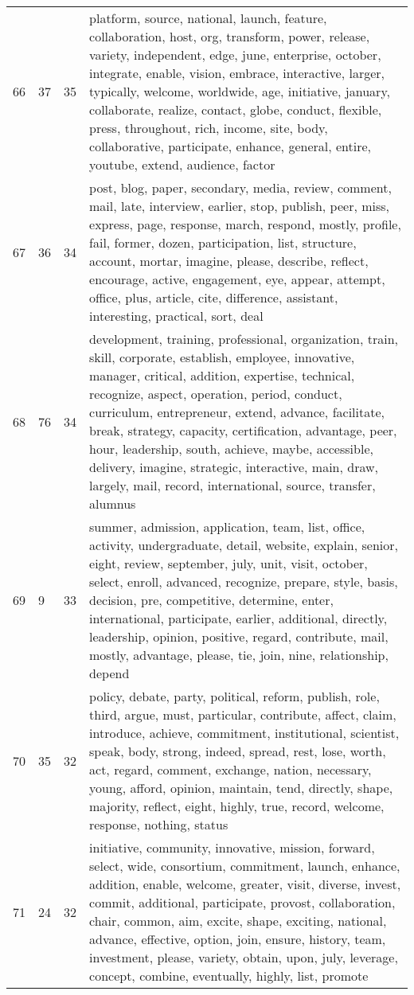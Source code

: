 \begin{table}[ht]
{\begin{tabularx}{\textwidth}{llrX}
   66 & 37 & 35 & platform, source, national, launch, feature, collaboration, host, org, transform, power, release, variety, independent, edge, june, enterprise, october, integrate, enable, vision, embrace, interactive, larger, typically, welcome, worldwide, age, initiative, january, collaborate, realize, contact, globe, conduct, flexible, press, throughout, rich, income, site, body, collaborative, participate, enhance, general, entire, youtube, extend, audience, factor \\ 
   67 & 36 & 34 & post, blog, paper, secondary, media, review, comment, mail, late, interview, earlier, stop, publish, peer, miss, express, page, response, march, respond, mostly, profile, fail, former, dozen, participation, list, structure, account, mortar, imagine, please, describe, reflect, encourage, active, engagement, eye, appear, attempt, office, plus, article, cite, difference, assistant, interesting, practical, sort, deal \\ 
   68 & 76 & 34 & development, training, professional, organization, train, skill, corporate, establish, employee, innovative, manager, critical, addition, expertise, technical, recognize, aspect, operation, period, conduct, curriculum, entrepreneur, extend, advance, facilitate, break, strategy, capacity, certification, advantage, peer, hour, leadership, south, achieve, maybe, accessible, delivery, imagine, strategic, interactive, main, draw, largely, mail, record, international, source, transfer, alumnus \\ 
   69 & 9 & 33 & summer, admission, application, team, list, office, activity, undergraduate, detail, website, explain, senior, eight, review, september, july, unit, visit, october, select, enroll, advanced, recognize, prepare, style, basis, decision, pre, competitive, determine, enter, international, participate, earlier, additional, directly, leadership, opinion, positive, regard, contribute, mail, mostly, advantage, please, tie, join, nine, relationship, depend \\ 
   70 & 35 & 32 & policy, debate, party, political, reform, publish, role, third, argue, must, particular, contribute, affect, claim, introduce, achieve, commitment, institutional, scientist, speak, body, strong, indeed, spread, rest, lose, worth, act, regard, comment, exchange, nation, necessary, young, afford, opinion, maintain, tend, directly, shape, majority, reflect, eight, highly, true, record, welcome, response, nothing, status \\ 
   71 & 24 & 32 & initiative, community, innovative, mission, forward, select, wide, consortium, commitment, launch, enhance, addition, enable, welcome, greater, visit, diverse, invest, commit, additional, participate, provost, collaboration, chair, common, aim, excite, shape, exciting, national, advance, effective, option, join, ensure, history, team, investment, please, variety, obtain, upon, july, leverage, concept, combine, eventually, highly, list, promote \\ 

\end{tabularx}}
\end{table}
